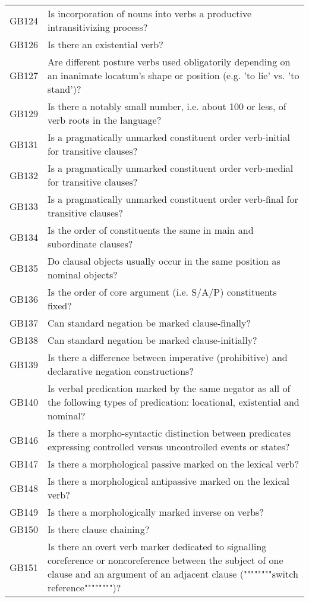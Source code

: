 \begin{longtable}{p{3cm}p{12cm}}
  GB124 & Is incorporation of nouns into verbs a productive intransitivizing process? \\ 
  GB126 & Is there an existential verb? \\ 
  GB127 & Are different posture verbs used obligatorily depending on an inanimate locatum's shape or position (e.g. 'to lie' vs. 'to stand')? \\ 
  GB129 & Is there a notably small number, i.e. about 100 or less, of verb roots in the language? \\ 
  GB131 & Is a pragmatically unmarked constituent order verb-initial for transitive clauses? \\ 
  GB132 & Is a pragmatically unmarked constituent order verb-medial for transitive clauses? \\ 
  GB133 & Is a pragmatically unmarked constituent order verb-final for transitive clauses? \\ 
  GB134 & Is the order of constituents the same in main and subordinate clauses? \\ 
  GB135 & Do clausal objects usually occur in the same position as nominal objects? \\ 
  GB136 & Is the order of core argument (i.e. S/A/P) constituents fixed? \\ 
  GB137 & Can standard negation be marked clause-finally? \\ 
  GB138 & Can standard negation be marked clause-initially? \\ 
  GB139 & Is there a difference between imperative (prohibitive) and declarative negation constructions? \\ 
  GB140 & Is verbal predication marked by the same negator as all of the following types of predication: locational, existential and nominal? \\ 
  GB146 & Is there a morpho-syntactic distinction between predicates expressing controlled versus uncontrolled events or states? \\ 
  GB147 & Is there a morphological passive marked on the lexical verb? \\ 
  GB148 & Is there a morphological antipassive marked on the lexical verb? \\ 
  GB149 & Is there a morphologically marked inverse on verbs? \\ 
  GB150 & Is there clause chaining? \\ 
  GB151 & Is there an overt verb marker dedicated to signalling coreference or noncoreference between the subject of one clause and an argument of an adjacent clause (""""""""switch reference"""""""")? \\ 

\end{longtable}
